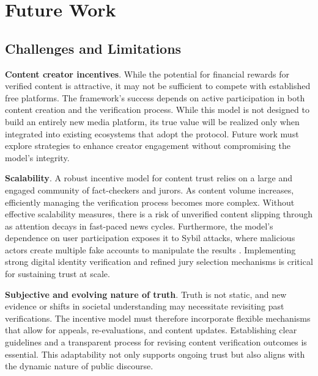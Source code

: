 \documentclass{article}
\begin{document}
    

\section{Future Work}

\subsection{Challenges and Limitations}

\textbf{Content creator incentives}. While the potential for financial rewards for verified content is attractive, it may not be sufficient to compete with established free platforms. The framework's success depends on active participation in both content creation and the verification process. While this model is not designed to build an entirely new media platform, its true value will be realized only when integrated into existing ecosystems that adopt the protocol. Future work must explore strategies to enhance creator engagement without compromising the model’s integrity.

\textbf{Scalability}. A robust incentive model for content trust relies on a large and engaged community of fact-checkers and jurors. As content volume increases, efficiently managing the verification process becomes more complex. Without effective scalability measures, there is a risk of unverified content slipping through as attention decays in fast-paced news cycles. Furthermore, the model's dependence on user participation exposes it to Sybil attacks, where malicious actors create multiple fake accounts to manipulate the results \cite{sybil:2002}. Implementing strong digital identity verification and refined jury selection mechanisms is critical for sustaining trust at scale.

\textbf{Subjective and evolving nature of truth}. Truth is not static, and new evidence or shifts in societal understanding may necessitate revisiting past verifications. The incentive model must therefore incorporate flexible mechanisms that allow for appeals, re-evaluations, and content updates. Establishing clear guidelines and a transparent process for revising content verification outcomes is essential. This adaptability not only supports ongoing trust but also aligns with the dynamic nature of public discourse.
\end{document}
